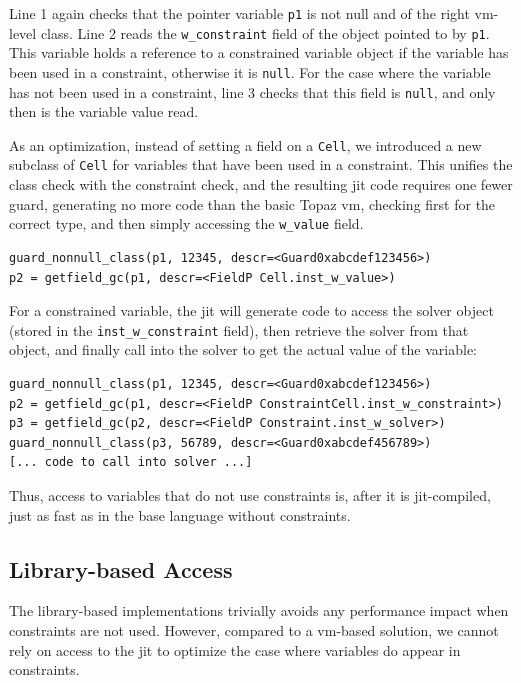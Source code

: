 Line 1 again checks that the pointer variable \verb!p1! is not null and of the
right \ac{vm}-level class.  Line 2 reads the \verb!w_constraint!  field of the
object pointed to by \verb!p1!. This variable holds a reference to a constrained
variable object if the variable has been used in a constraint, otherwise it is
\verb!null!. For the case where the variable has not been used in a constraint,
line 3 checks that this field is \verb!null!, and only then is the variable
value read.

As an optimization, instead of setting a field on a \verb!Cell!, we introduced a
new subclass of \verb!Cell! for variables that have been used in a
constraint. This unifies the class check with the constraint check, and the
resulting \ac{jit} code requires one fewer guard, generating no more code than
the basic Topaz \ac{vm}, checking first for the correct type, and then simply
accessing the \verb!w_value! field.
\begin{lstlisting}[language=pypytrace]
guard_nonnull_class(p1, 12345, descr=<Guard0xabcdef123456>)
p2 = getfield_gc(p1, descr=<FieldP Cell.inst_w_value>)
\end{lstlisting}

For a constrained variable, the \ac{jit} will generate code to access the solver
object (stored in the \verb!inst_w_constraint!  field), then retrieve the solver
from that object, and finally call into the solver to get the actual value of
the variable:
\begin{lstlisting}[language=pypytrace]
guard_nonnull_class(p1, 12345, descr=<Guard0xabcdef123456>)
p2 = getfield_gc(p1, descr=<FieldP ConstraintCell.inst_w_constraint>)
p3 = getfield_gc(p2, descr=<FieldP Constraint.inst_w_solver>)
guard_nonnull_class(p3, 56789, descr=<Guard0xabcdef456789>)
[... code to call into solver ...]
\end{lstlisting}
Thus, access to variables that do  not use constraints is, after it is
\ac{jit}-compiled, just  as  fast  as in  the  base language  without
constraints.

\subsection*{Library-based Access}
The library-based implementations trivially avoids any performance impact when
constraints are not used. However, compared to a \ac{vm}-based solution, we
cannot rely on access to the \ac{jit} to optimize the case where variables do
appear in constraints.

